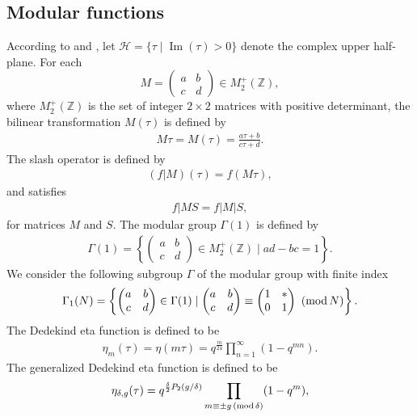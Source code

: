 \documentclass[10pt,a4paper]{amsart}
\numberwithin{equation}{section}
\theoremstyle{definition}
\begin{document}
\subsection{Modular functions}
According to \cite{Berndt-III} and \cite{Ra77}, let $\mathcal{H}=\{\tau \mid \operatorname{Im}(\tau) > 0\}$ denote the complex upper half-plane. For each \[M=\begin{pmatrix} a & b \\c & d \end{pmatrix} \in M_2^{+}(\mathbb{Z}),\] where $M_2^{+}(\mathbb{Z})$ is the set of integer $2\times 2$ matrices with positive determinant, the bilinear transformation $M(\tau)$ is defined by
\begin{align*}
M\tau=M(\tau)=\frac{a\tau+b}{c\tau+d}.
\end{align*}
The slash operator is defined by
\begin{align*}
(f|M)(\tau)=f(M\tau),
\end{align*}
and satisfies
\begin{align*}
f|MS=f|M|S,
\end{align*}
for matrices $M$ and $S$. The modular group $\Gamma(1)$ is defined by
\begin{align*}
\Gamma(1)=\left\{\begin{pmatrix} a & b \\c & d \end{pmatrix} \in M_2^{+}(\mathbb{Z}) \mid ad-bc=1 \right\}.
\end{align*}
We consider the following subgroup $\Gamma$ of the modular group with finite index
\begin{align*}
\Gamma_1(N)=\left\{\begin{pmatrix} a & b \\c & d \end{pmatrix} \in \Gamma(1) \mid \begin{pmatrix} a & b \\c & d \end{pmatrix}  \equiv \begin{pmatrix} 1 & * \\0 & 1 \end{pmatrix} \ ({\rm mod}\, N) \right\}.
\end{align*}
The Dedekind eta function is defined to be
\begin{align*}
\eta_m(\tau)=\eta(m\tau)=q^{\frac{m}{24}}\prod_{n=1}^{\infty}(1-q^{mn}).
\end{align*}
The generalized Dedekind eta function is defined to be
\begin{align}\label{generalized-eta}
\eta_{\delta,g}(\tau)=q^{\frac{\delta}{2}P_2(g/\delta)}\prod_{m\equiv\pm g\,({\rm mod}\,\delta)}(1-q^m),
\end{align}
\end{document}

